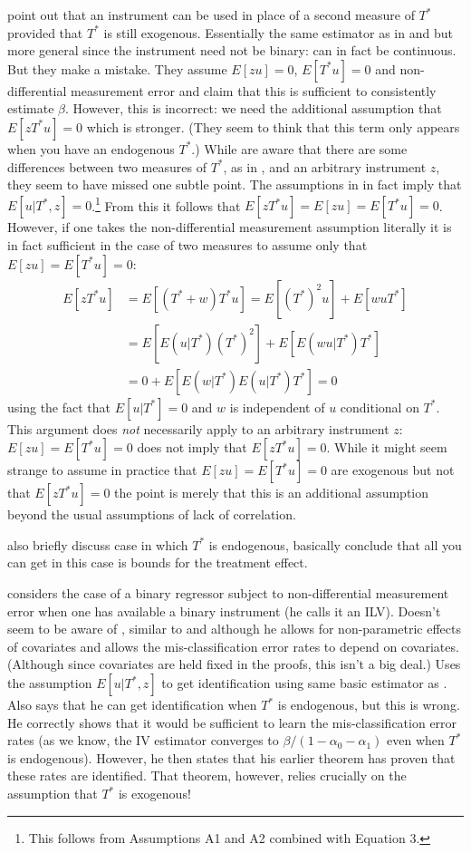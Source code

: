 \cite{FL} point out that an instrument can be used in place of a second measure of $T^*$ provided that $T^*$ is still exogenous.
Essentially the same estimator as in \cite{BBS} and \cite{KRS} but more general since the instrument need not be binary: can in fact be continuous.
But they make a mistake. 
They assume $E[zu]=0$, $E[T^*u]=0$ and non-differential measurement error and claim that this is sufficient to consistently estimate $\beta$.
However, this is incorrect: we need the additional assumption that $E[zT^*u]=0$ which is stronger.
(They seem to think that this term only appears when you have an endogenous $T^*$.)
While \cite{FL} are aware that there are some differences between two measures of $T^*$, as in \cite{BBS}, and an arbitrary instrument $z$, they seem to have missed one subtle point.
The assumptions in \cite{BBS} in fact imply that $E[u|T^*,z]=0$.\footnote{This follows from Assumptions A1 and A2 combined with Equation 3.}
From this it follows that $E[zT^*u]=E[zu]=E[T^*u]=0$. 
However, if one takes the non-differential measurement assumption literally it is in fact sufficient in the case of two measures to assume only that $E[zu]=E[T^*u]=0$:
\begin{align}
  E[zT^*u] &= E[(T^*+w)T^*u] = E[(T^*)^2u] + E[wuT^*]  \\
  &= E\left[ E\left( u|T^* \right)(T^*)^2 \right] + E\left[E\left( wu|T^* \right)T^*\right]\\
  &= 0 + E\left[ E(w|T^*)E(u|T^*)T^* \right] = 0
\end{align}
using the fact that $E[u|T^*]=0$ and $w$ is independent of $u$ conditional on $T^*$.
This argument does \emph{not} necessarily apply to an arbitrary instrument $z$: $E[zu]=E[T^*u]=0$ does not imply that $E[zT^*u]=0$.
While it might seem strange to assume in practice that $E[zu]=E[T^*u]=0$ are exogenous but not that $E[zT^*u]=0$ the point is merely that this is an additional assumption beyond the usual assumptions of lack of correlation. 


\cite{FL} also briefly discuss case in which $T^*$ is endogenous, basically conclude that all you can get in this case is bounds for the treatment effect.

\cite{Mahajan} considers the case of a binary regressor subject to non-differential measurement error when one has available a binary instrument (he calls it an ILV).
Doesn't seem to be aware of \cite{FL}, similar to \cite{BBS} and \cite{KRS} although he allows for non-parametric effects of covariates and allows the mis-classification error rates to depend on covariates.
(Although since covariates are held fixed in the proofs, this isn't a big deal.)
Uses the assumption $E[u|T^*,z]$ to get identification using same basic estimator as \cite{BBS}.
Also says that he can get identification when $T^*$ is endogenous, but this is wrong.
He correctly shows that it would be sufficient to learn the mis-classification error rates (as we know, the IV estimator converges to $\beta/(1-\alpha_0-\alpha_1)$ even when $T^*$ is endogenous).
However, he then states that his earlier theorem has proven that these rates are identified. 
That theorem, however, relies crucially on the assumption that $T^*$ is exogenous!

